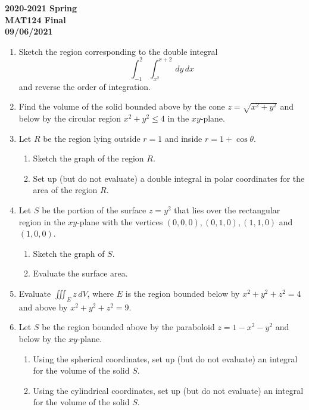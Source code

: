 \documentclass[a4paper, 12pt]{article}
\begin{document}
\pagestyle{empty}

\begin{center}
\textbf{2020-2021 Spring \\MAT124 Final\\09/06/2021}
\end{center}

\begin{enumerate}[leftmargin=*,label=\textbf{\arabic*.}]
\item Sketch the region corresponding to the double integral
\[\int_{-1}^2\int_{x^2}^{x+2}\,dy\,dx\]
and reverse the order of integration.

\item Find the volume of the solid bounded above by the cone $z=\sqrt{x^2+y^2}$ and below by the circular region $x^2+y^2\leq4$ in the $xy$-plane.

\item Let $R$ be the region lying outside $r=1$ and inside $r=1+\cos\theta$.
\begin{enumerate}[leftmargin=*,label=\textbf{\alph*.}]
\item Sketch the graph of the region $R$.
\item Set up (but do not evaluate) a double integral in polar coordinates for the area of the region $R$.
\end{enumerate}

\item Let $S$ be the portion of the surface $z=y^2$ that lies over the rectangular region in the $xy$-plane with the vertices $(0,0,0), (0,1,0), (1,1,0)$ and $(1,0,0)$.
\begin{enumerate}[leftmargin=*,label=\textbf{\alph*.}]
\item Sketch the graph of $S$.
\item Evaluate the surface area.
\end{enumerate}

\item Evaluate $\displaystyle \iiint_E z\,dV$, where $E$ is the region bounded below by $x^2+y^2+z^2=4$ and above by $x^2+y^2+z^2=9$.

\item Let $S$ be the region bounded above by the paraboloid $z=1-x^2-y^2$ and below by the $xy$-plane.
\begin{enumerate}[leftmargin=*,label=\textbf{\alph*.}]
\item Using the spherical coordinates, set up (but do not evaluate) an integral for the volume of the solid $S$.
\item Using the cylindrical coordinates, set up (but do not evaluate) an integral for the volume of the solid $S$.
\end{enumerate}
\end{enumerate}
\end{document}
